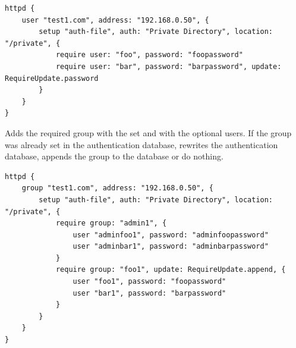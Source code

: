 \begin{lstlisting}[style=Java]
httpd {
    user "test1.com", address: "192.168.0.50", {
        setup "auth-file", auth: "Private Directory", location: "/private", {
            require user: "foo", password: "foopassword"
            require user: "bar", password: "barpassword", update: RequireUpdate.password
        }
    }
}
\end{lstlisting}


Adds the required group with the set  and with the optional users.
If the group was already set in the authentication database, 
 rewrites the authentication database,
 appends the group to the database or
 do nothing.

\begin{lstlisting}[style=Java]
httpd {
    group "test1.com", address: "192.168.0.50", {
        setup "auth-file", auth: "Private Directory", location: "/private", {
            require group: "admin1", {
                user "adminfoo1", password: "adminfoopassword"
                user "adminbar1", password: "adminbarpassword"
            }
            require group: "foo1", update: RequireUpdate.append, {
                user "foo1", password: "foopassword"
                user "bar1", password: "barpassword"
            }
        }
    }
}
\end{lstlisting}
